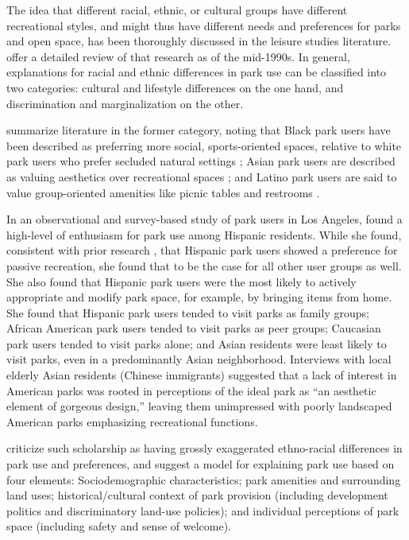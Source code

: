 \documentclass[3p, authoryear, review]{elsarticle} %
\begin{document}
The idea that different racial, ethnic, or cultural groups have different
recreational styles, and might thus have different needs and preferences for
parks and open space, has been thoroughly discussed in the leisure studies
literature. \citet{husbands1995ethnicity} offer a detailed review of that research as
of the mid-1990s. In general, explanations for racial and ethnic differences in
park use can be classified into two categories: cultural and lifestyle
differences on the one hand, and discrimination and marginalization on the
other.

\citet{byrne2009nature} summarize literature in the former category, noting that Black
park users have been described as preferring more social, sports-oriented
spaces, relative to white park users who prefer secluded natural settings
\citep{washburne1978black, hutchison1987ethnicity, floyd1999convergence, gobster2002managing, payne2002examination, ho2005gender}; Asian park users
are described as valuing aesthetics over recreational spaces
\citep{gobster2002managing, payne2002examination, ho2005gender}; and Latino park
users are said to value group-oriented amenities like picnic tables and
restrooms \citep{baas1993influence, hutchison1987ethnicity, irwin1990mexican}.

In an observational and survey-based study of park users in Los Angeles,
\citet{loukaitou1995urban} found a high-level of enthusiasm for park use among Hispanic
residents. While she found, consistent with prior research
\citep{baas1993influence, hutchison1987ethnicity, irwin1990mexican}, that
Hispanic park users showed a preference for passive recreation, she found that
to be the case for all other user groups as well. She also found that Hispanic
park users were the most likely to actively appropriate and modify park space,
for example, by bringing items from home. She found that Hispanic park users
tended to visit parks as family groups; African American park users tended to
visit parks as peer groups; Caucasian park users tended to visit parks alone;
and Asian residents were least likely to visit parks, even in a predominantly
Asian neighborhood. Interviews with local elderly Asian residents (Chinese
immigrants) suggested that a lack of interest in American parks was rooted in
perceptions of the ideal park as ``an aesthetic element of gorgeous design,''
leaving them unimpressed with poorly landscaped American parks emphasizing
recreational functions.

\citet{byrne2009nature} criticize such scholarship as having grossly exaggerated
ethno-racial differences in park use and preferences, and suggest a model for
explaining park use based on four elements: Sociodemographic characteristics;
park amenities and surrounding land uses; historical/cultural context of park
provision (including development politics and discriminatory land-use
policies); and individual perceptions of park space (including safety and
sense of welcome).
\end{document}
